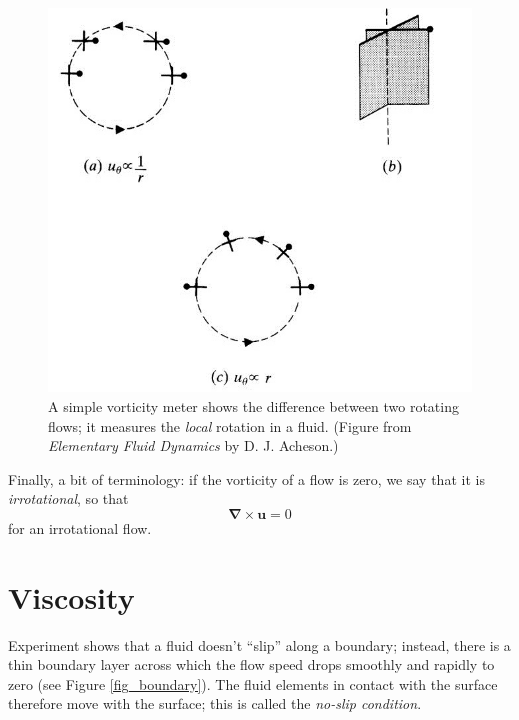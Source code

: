 \begin{figure}
\centering
\includegraphics[width=0.7\linewidth]{Figures/Chapter1/fig_vorticity_meter.jpg}
\caption{A simple vorticity meter shows the difference between two rotating flows; it measures the \emph{local} rotation in a fluid. (Figure from \emph{Elementary Fluid Dynamics} by D. J. Acheson.) }
\label{fig_vorticity_meter}
\end{figure}

Finally, a bit of terminology: if the vorticity of a flow is zero, we say that it is \emph{irrotational}, so that
\begin{equation}
\boxed{
\boldsymbol{\nabla} \times \mathbf{u} = 0
}
\end{equation}
for an irrotational flow.





\section{Viscosity}
\label{sec_viscosity}

Experiment shows that a fluid doesn't ``slip'' along a boundary; instead, there is a thin boundary layer across which the flow speed drops smoothly and rapidly to zero (see Figure \ref{fig_boundary}).  The fluid elements in contact with the surface therefore move with the surface; this is called the \emph{no-slip condition}.

